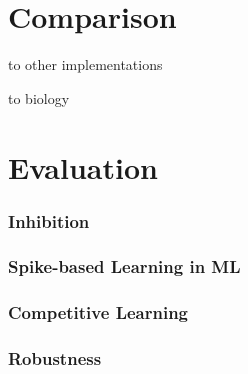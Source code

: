 \section{Comparison}
\label{sec:comparison}

to other implementations

to biology


\section{Evaluation}
\label{sec:evaluation}

\subsubsection{Inhibition}

\subsubsection{Spike-based Learning in ML}

\subsubsection{Competitive Learning}

\subsubsection{Robustness}